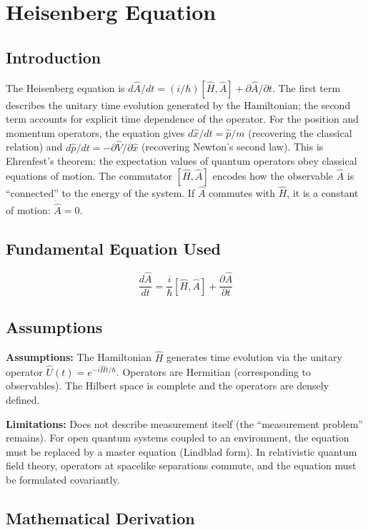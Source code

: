 \chapter{Heisenberg Equation}

\section*{Introduction}

The Heisenberg equation is $d\hat{A}/dt = (i/\hbar)[\hat{H}, \hat{A}] + \partial\hat{A}/\partial t$. The first term describes the unitary time evolution generated by the Hamiltonian; the second term accounts for explicit time dependence of the operator. For the position and momentum operators, the equation gives $d\hat{x}/dt = \hat{p}/m$ (recovering the classical relation) and $d\hat{p}/dt = -\partial\hat{V}/\partial\hat{x}$ (recovering Newton's second law). This is Ehrenfest's theorem: the expectation values of quantum operators obey classical equations of motion. The commutator $[\hat{H}, \hat{A}]$ encodes how the observable $\hat{A}$ is ``connected'' to the energy of the system. If $\hat{A}$ commutes with $\hat{H}$, it is a constant of motion: $\dot{\hat{A}} = 0$.
\section*{Fundamental Equation Used}

\[
\frac{d\hat{A}}{dt}=\frac{i}{\hbar}[\hat{H},\hat{A}]+\frac{\partial\hat{A}}{\partial t}
\]
\section*{Assumptions}

\textbf{Assumptions:} The Hamiltonian $\hat{H}$ generates time evolution via the unitary operator $\hat{U}(t) = e^{-i\hat{H}t/\hbar}$. Operators are Hermitian (corresponding to observables). The Hilbert space is complete and the operators are densely defined.


\textbf{Limitations:} Does not describe measurement itself (the ``measurement problem'' remains). For open quantum systems coupled to an environment, the equation must be replaced by a master equation (Lindblad form). In relativistic quantum field theory, operators at spacelike separations commute, and the equation must be formulated covariantly.


\section*{Mathematical Derivation}

